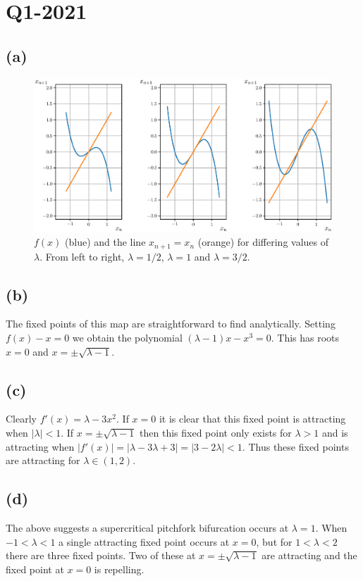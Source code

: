 \documentclass{article}
\begin{document}
\section*{Q1-2021}
\subsection*{(a)}
\begin{figure}[H]
    \centering
    \hspace{-0.5in}
    \includegraphics[scale = 0.7]{Figure_11.eps}
	\caption{$f(x)$ (blue) and the line $x_{n+1} = x_n$ (orange) for differing values of $\lambda$. 
    From left to right, $\lambda = 1/2$, $\lambda = 1$ and $\lambda = 3/2$.}
    \label{fig:comp_vals_cubic}
\end{figure}

\subsection*{(b)}
The fixed points of this map are straightforward to find analytically. Setting $f(x) -x = 0$ 
we obtain the polynomial $(\lambda -1)x - x^3 = 0$. This has roots $x = 0$ and $x = \pm \sqrt{\lambda -1}$. 

\subsection*{(c)}
Clearly $f'(x) = \lambda - 3x^2$. If $x = 0$ it is clear that this fixed point is attracting 
when $|\lambda| < 1$. If $x = \pm \sqrt{\lambda -1}$ then this fixed point only exists for $\lambda > 1$ 
and is attracting when $|f'(x)| = |\lambda - 3\lambda +3| = |3 -2\lambda| < 1$. Thus these fixed points 
are attracting for $\lambda \in (1,2)$. 

\subsection*{(d)}
The above suggests a supercritical pitchfork bifurcation occurs at $\lambda = 1$. When $-1 < \lambda < 1$ a single 
attracting fixed point occurs at $x = 0$, but for $1< \lambda < 2$ there are three fixed points. Two of these at 
$x = \pm \sqrt{\lambda -1}$ are attracting and the fixed point at $x = 0$ is repelling.
\end{document}
